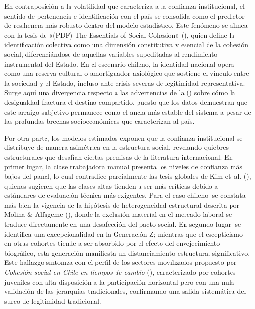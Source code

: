 \documentclass[
  spanish,
  a4paper,
  oneside]{scrbook}
\begin{document}
En contraposición a la volatilidad que caracteriza a la confianza
institucional, el sentido de pertenencia e identificación con el país se
consolida como el predictor de resiliencia más robusto dentro del modelo
estadístico. Este fenómeno se alinea con la tesis de {«({PDF}) {The
Essentials} of {Social Cohesion}»}
(), quien define la identificación
colectiva como una dimensión constitutiva y esencial de la cohesión
social, diferenciándose de aquellas variables supeditadas al rendimiento
instrumental del Estado. En el escenario chileno, la identidad nacional
opera como una reserva cultural o amortiguador axiológico que sostiene
el vínculo entre la sociedad y el Estado, incluso ante crisis severas de
legitimidad representativa. Surge aquí una divergencia respecto a las
advertencias de la
() sobre
cómo la desigualdad fractura el destino compartido, puesto que los datos
demuestran que este arraigo subjetivo permanece como el ancla más
estable del sistema a pesar de las profundas brechas socioeconómicas que
caracterizan al país.

Por otra parte, los modelos estimados exponen que la confianza
institucional se distribuye de manera asimétrica en la estructura
social, revelando quiebres estructurales que desafían ciertas premisas
de la literatura internacional. En primer lugar, la clase trabajadora
manual presenta los niveles de confianza más bajos del panel, lo cual
contradice parcialmente las tesis globales de Kim et~al.
(), quienes sugieren que las clases
altas tienden a ser más críticas debido a estándares de evaluación
técnica más exigentes. Para el caso chileno, se constata más bien la
vigencia de la hipótesis de heterogeneidad estructural descrita por
Molina \& Alfageme (), donde
la exclusión material en el mercado laboral se traduce directamente en
una desafección del pacto social. En segundo lugar, se identifica una
excepcionalidad en la Generación Z; mientras que el escepticismo en
otras cohortes tiende a ser absorbido por el efecto del envejecimiento
biográfico, esta generación manifiesta un distanciamiento estructural
significativo. Este hallazgo sintoniza con el perfil de los sectores
movilizados propuesto por \emph{{Cohesión social en Chile en tiempos de
cambio}} (), caracterizado por
cohortes juveniles con alta disposición a la participación horizontal
pero con una nula validación de las jerarquías tradicionales,
confirmando una salida sistemática del surco de legitimidad tradicional.
\end{document}
